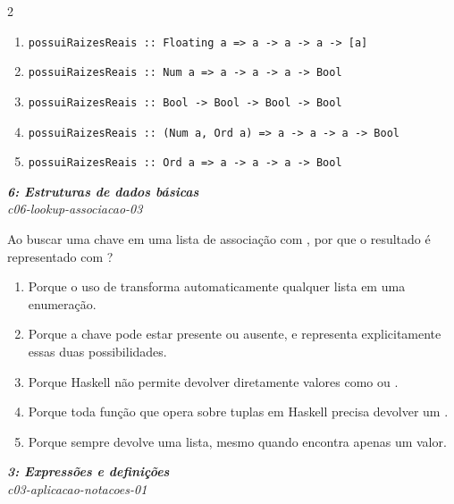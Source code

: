 \documentclass[a4paper,10pt,brazil]{article}
\begin{document}
\begin{multicols}{2}
\begin{enumerate}
  \item \texttt{possuiRaizesReais :: Floating a => a -> a -> a -> [a]}
  \item \texttt{possuiRaizesReais :: Num a => a -> a -> a -> Bool}
  \item \texttt{possuiRaizesReais :: Bool -> Bool -> Bool -> Bool}
  \item \texttt{possuiRaizesReais :: (Num a, Ord a) => a -> a -> a -> Bool}
  \item \texttt{possuiRaizesReais :: Ord a => a -> a -> a -> Bool}

\end{enumerate}

\begin{flushright}
  \footnotesize
  \textit{\textbf{6: Estruturas de dados básicas}}\\
  \textit{c06-lookup-associacao-03}\\

\end{flushright}
Ao buscar uma chave em uma lista de associação com , por que o resultado é representado com ?

\begin{enumerate}
  \item Porque o uso de  transforma automaticamente qualquer lista em uma enumeração.

  \item Porque a chave pode estar presente ou ausente, e  representa explicitamente essas duas possibilidades.

  \item Porque Haskell não permite devolver diretamente valores como  ou .

  \item Porque toda função que opera sobre tuplas em Haskell precisa devolver um .

  \item Porque  sempre devolve uma lista, mesmo quando encontra apenas um valor.


\end{enumerate}

\begin{flushright}
  \footnotesize
  \textit{\textbf{3: Expressões e definições}}\\
  \textit{c03-aplicacao-notacoes-01}\\


\end{flushright}
\end{multicols}
\end{document}
